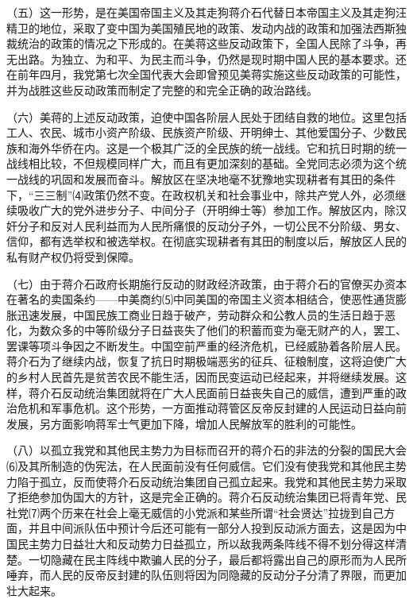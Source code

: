 \documentclass[UTF-8, a5paper, 12pt]{ctexart}
\begin{document}
（五）这一形势，是在美国帝国主义及其走狗蒋介石代替日本帝国主义及其走狗汪精卫的地位，采取了变中国为美国殖民地的政策、发动内战的政策和加强法西斯独裁统治的政策的情况之下形成的。在美蒋这些反动政策下，全国人民除了斗争，再无出路。为独立、为和平、为民主而斗争，仍然是现时期中国人民的基本要求。还在前年四月，我党第七次全国代表大会即曾预见美蒋实施这些反动政策的可能性，并为战胜这些反动政策而制定了完整的和完全正确的政治路线。

（六）美蒋的上述反动政策，迫使中国各阶层人民处于团结自救的地位。这里包括工人、农民、城市小资产阶级、民族资产阶级、开明绅士、其他爱国分子、少数民族和海外华侨在内。这是一个极其广泛的全民族的统一战线。它和抗日时期的统一战线相比较，不但规模同样广大，而且有更加深刻的基础。全党同志必须为这个统一战线的巩固和发展而奋斗。解放区在坚决地毫不犹豫地实现耕者有其田的条件下，“三三制”⑷政策仍然不变。在政权机关和社会事业中，除共产党人外，必须继续吸收广大的党外进步分子、中间分子（开明绅士等）参加工作。解放区内，除汉奸分子和反对人民利益而为人民所痛恨的反动分子外，一切公民不分阶级、男女、信仰，都有选举权和被选举权。在彻底实现耕者有其田的制度以后，解放区人民的私有财产权仍将受到保障。

（七）由于蒋介石政府长期施行反动的财政经济政策，由于蒋介石的官僚买办资本在著名的卖国条约——中美商约⑸中同美国的帝国主义资本相结合，使恶性通货膨胀迅速发展，中国民族工商业日趋于破产，劳动群众和公教人员的生活日趋于恶化，为数众多的中等阶级分子日益丧失了他们的积蓄而变为毫无财产的人，罢工、罢课等项斗争因之不断发生。中国空前严重的经济危机，已经威胁着各阶层人民。蒋介石为了继续内战，恢复了抗日时期极端恶劣的征兵、征粮制度，这将迫使广大的乡村人民首先是贫苦农民不能生活，因而民变运动已经起来，并将继续发展。这样，蒋介石反动统治集团就将在广大人民面前日益丧失自己的威信，遭到严重的政治危机和军事危机。这个形势，一方面推动蒋管区反帝反封建的人民运动日益向前发展，另方面影响蒋军士气更加下降，增加人民解放军的胜利的可能性。

（八）以孤立我党和其他民主势力为目标而召开的蒋介石的非法的分裂的国民大会⑹及其所制造的伪宪法，在人民面前没有任何威信。它们没有使我党和其他民主势力陷于孤立，反而使蒋介石反动统治集团自己孤立起来。我党和其他民主势力采取了拒绝参加伪国大的方针，这是完全正确的。蒋介石反动统治集团已将青年党、民社党⑺两个历来在社会上毫无威信的小党派和某些所谓“社会贤达”拉拢到自己方面，并且中间派队伍中预计今后还可能有一部分人投到反动派方面去，这是因为中国民主势力日益壮大和反动势力日益孤立，所以敌我两条阵线不得不划分得这样清楚。一切隐藏在民主阵线中欺骗人民的分子，最后都将露出自己的原形而为人民所唾弃，而人民的反帝反封建的队伍则将因为同隐藏的反动分子分清了界限，而更加壮大起来。
\end{document}
